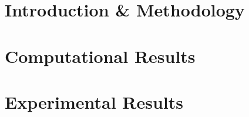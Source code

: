 \documentclass[a4paper, oneside, 11pt]{report} %
\begin{document}
\part{Introduction \& Methodology}

\newpage


\newpage

\part{Computational Results}

\newpage


\newpage


\part{Experimental Results}

\newpage


\newpage
\end{document}
